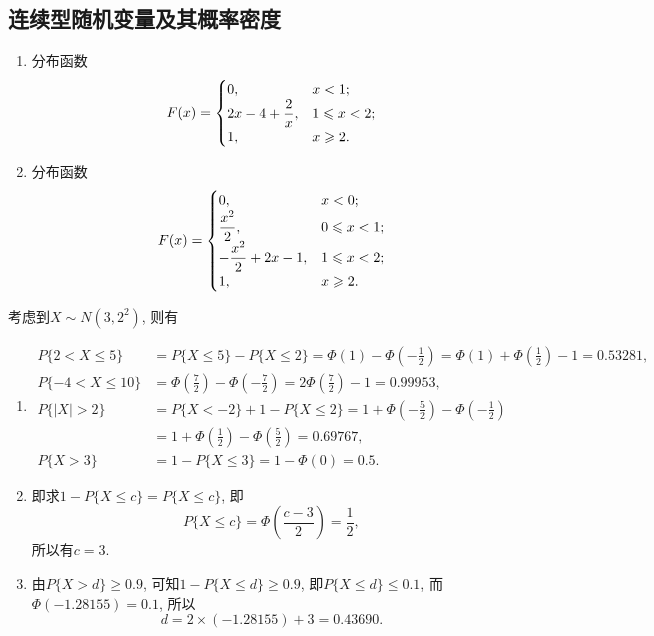 	\subsection{连续型随机变量及其概率密度}
	\setcounter{prob}{20}
	\begin{prob}
		\begin{enumerate}
			\item
			分布函数
			\[
				F(x)=
				\begin{cases}
				0,&x<1;\\
				\displaystyle 2x-4+\frac{2}{x}, & 1\leqslant x< 2;\\
				1, &x\geqslant2.
				\end{cases}
			\]
			\item
			分布函数
			\[
				F(x)=
				\begin{cases}
				0, & x<0;\\
				\displaystyle\frac{x^2}{2}, & 0\leqslant x <1;\\
				\displaystyle -\frac{x^2}{2}+2x-1, &1\leqslant x<2;\\
				1,& x\geqslant 2.
				\end{cases}
			\]
		\end{enumerate}
	\end{prob}
	\setcounter{prob}{25}
	\begin{prob}
		考虑到$X\sim N(3,2^2)$, 则有
		\begin{enumerate}
			\item
			\begin{align*}
				P\{2<X\leqslant 5\}&=P\{X\leqslant 5\}-P\{X\leqslant 2\}=\varPhi(1)-\varPhi\left(-\frac{1}{2}\right)=\varPhi(1)+\varPhi\left(\frac{1}{2}\right)-1=0.53281,\\
				P\{-4<X\leqslant 10\}&=\varPhi\left(\frac{7}{2}\right)-\varPhi\left(-\frac{7}{2}\right)=2\varPhi\left(\frac{7}{2}\right)-1=0.99953,\\
				P\{|X|>2\}&=P\{X<-2\}+1-P\{X\leqslant 2\}=1+\varPhi\left(-\frac{5}{2}\right)-\varPhi\left(-\frac{1}{2}\right)\\
				&=1+\varPhi\left(\frac{1}{2}\right)-\varPhi\left(\frac{5}{2}\right)=0.69767,\\
				P\{X>3\}&=1-P\{X\leqslant 3\}=1-\varPhi(0)=0.5.
			\end{align*}
			\item
			即求$1-P\{X\leqslant c\}=P\{X\leqslant c\}$, 即
			\[
				P\{X\leqslant c\}=\varPhi\left(\frac{c-3}{2}\right)=\frac{1}{2},
			\]
			所以有$c=3$.
			\item
			由$P\{X>d\}\geqslant 0.9$, 可知$1-P\{X\leqslant d\}\geqslant 0.9$, 即$P\{X\leqslant d\}\leqslant 0.1$, 而$\varPhi(-1.28155)=0.1$, 所以
			\[
				d = 2\times(-1.28155) +3=0.43690.
			\]
		\end{enumerate}
	\end{prob}
